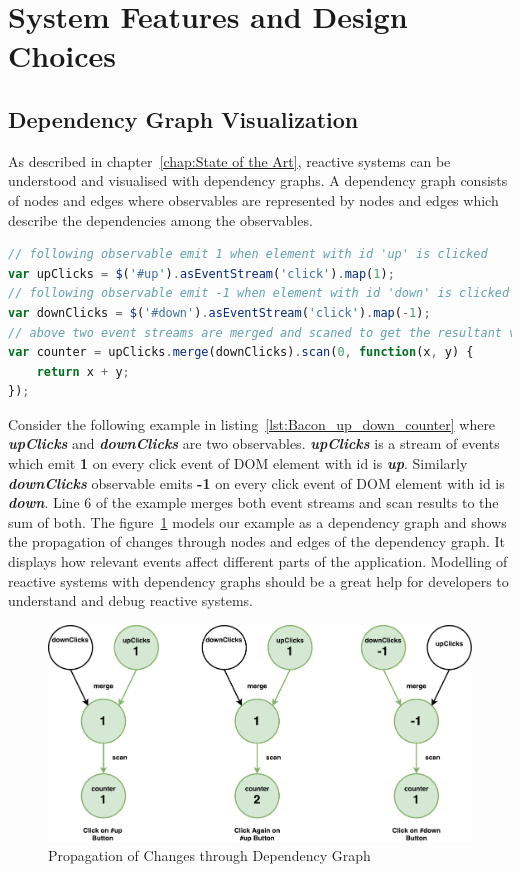 \section{System Features and Design Choices}
\subsection{Dependency Graph Visualization}
As described in chapter~\ref{chap:State of the Art}, reactive systems can be understood and visualised with dependency graphs. A dependency graph consists of nodes and edges where observables are represented by nodes and edges which describe the dependencies among the observables. 

\begin{lstlisting}[language=JavaScript, caption=Bacon.js Example of Up - Down Counter  , label={lst:Bacon_up_down_counter}]
// following observable emit 1 when element with id 'up' is clicked
var upClicks = $('#up').asEventStream('click').map(1);
// following observable emit -1 when element with id 'down' is clicked
var downClicks = $('#down').asEventStream('click').map(-1);
// above two event streams are merged and scaned to get the resultant value
var counter = upClicks.merge(downClicks).scan(0, function(x, y) {
	return x + y;
});
\end{lstlisting}

Consider the following example in listing~\ref{lst:Bacon_up_down_counter} where \textbf{\textit{upClicks}} and \textbf{\textit{downClicks}} are two observables. \textbf{\textit{upClicks}} is a stream of events which emit  \textbf{1} on every click event of DOM element with id is \textbf{\textit{up}}. Similarly \textbf{\textit{downClicks}} observable emits  \textbf{-1} on every click event of DOM element with id is \textbf{\textit{down}}. Line 6 of the example merges both event streams and scan results to the sum of both. The figure~\ref{fig:sys-design_dependency-graph} models our example as a dependency graph and shows the propagation of changes through nodes and edges of the dependency graph. It displays how relevant events affect different parts of the application. Modelling of reactive systems with dependency graphs should be a great help for developers to understand and debug reactive systems.

\begin{figure}[!h]
	\centering
	\includegraphics[scale=0.5,trim=0 0 0 0]{gfx/sys-design_dependency-graph.pdf}
	\caption{Propagation of Changes through Dependency Graph}
	\label{fig:sys-design_dependency-graph}
\end{figure}


